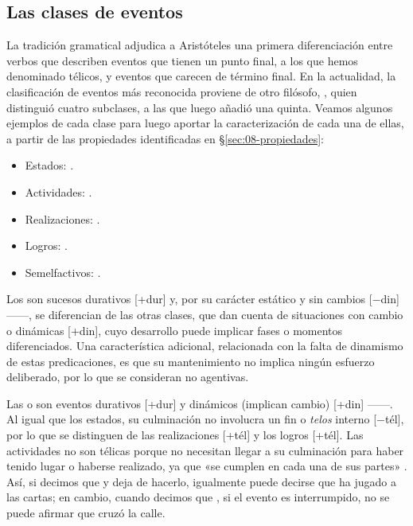 \subsection{Las clases de eventos}\label{sec:08-clases}

La tradición gramatical adjudica a Aristóteles una primera diferenciación entre
verbos que describen eventos que tienen un punto final, a los que hemos
denominado télicos, y eventos que carecen de término final. En la actualidad, la
clasificación de eventos más reconocida proviene de otro filósofo,
\textcite{vendler1967}, quien distinguió cuatro subclases, a las que luego
\textcite{comrie1976} añadió una quinta. Veamos algunos ejemplos de cada clase
para luego aportar la caracterización de cada una de ellas, a partir de las
propiedades identificadas en §\ref{sec:08-propiedades}:

\begin{itemize}
  \item Estados: .
  \item Actividades: .
  \item Realizaciones: .
  \item Logros: .
  \item Semelfactivos: .
\end{itemize}

Los  son sucesos durativos [+dur] y, por su carácter estático y
sin cambios [$-$din] ------, se diferencian
de las otras clases, que dan cuenta de situaciones con cambio o dinámicas
[+din], cuyo desarrollo puede implicar fases o momentos diferenciados. Una
característica adicional, relacionada con la falta de dinamismo de estas
predicaciones, es que su mantenimiento no implica ningún esfuerzo deliberado,
por lo que se consideran no agentivas.

Las  o  son eventos durativos [+dur] y
dinámicos (implican cambio) [+din] ------. Al
igual que los estados, su culminación no involucra un fin o \textit{telos}
interno [$-$tél], por lo que se distinguen de las realizaciones [+tél] y los
logros [+tél]. Las actividades no son télicas porque no necesitan llegar a su
culminación para haber tenido lugar o haberse realizado, ya que «se cumplen en
cada una de sus partes» \parencite[62]{garciafernandez1999}. Así, si decimos que
 y deja de hacerlo, igualmente puede decirse que
ha jugado a las cartas; en cambio, cuando decimos que , si el evento es interrumpido, no se puede afirmar que cruzó la calle.

